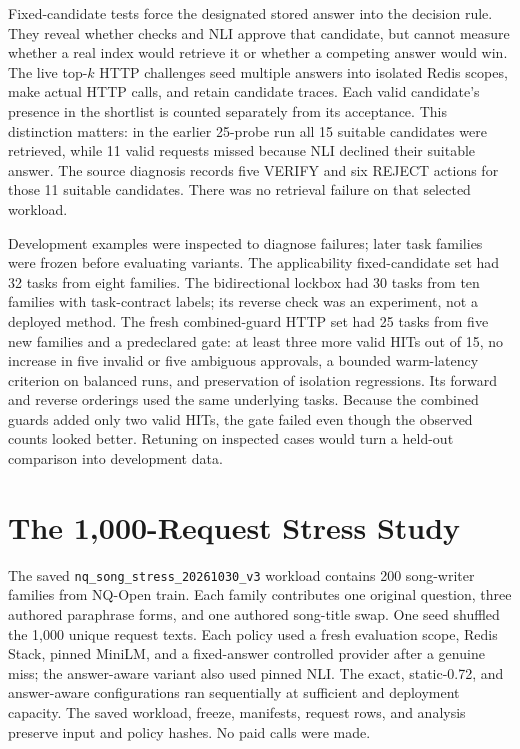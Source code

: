 Fixed-candidate tests force the designated stored answer into the decision rule. They reveal whether checks and NLI approve that candidate, but cannot measure whether a real index would retrieve it or whether a competing answer would win. The live top-$k$ HTTP challenges seed multiple answers into isolated Redis scopes, make actual HTTP calls, and retain candidate traces. Each valid candidate's presence in the shortlist is counted separately from its acceptance. This distinction matters: in the earlier 25-probe run all 15 suitable candidates were retrieved, while 11 valid requests missed because NLI declined their suitable answer. The source diagnosis records five VERIFY and six REJECT actions for those 11 suitable candidates. There was no retrieval failure on that selected workload.

Development examples were inspected to diagnose failures; later task families were frozen before evaluating variants. The applicability fixed-candidate set had 32 tasks from eight families. The bidirectional lockbox had 30 tasks from ten families with task-contract labels; its reverse check was an experiment, not a deployed method. The fresh combined-guard HTTP set had 25 tasks from five new families and a predeclared gate: at least three more valid HITs out of 15, no increase in five invalid or five ambiguous approvals, a bounded warm-latency criterion on balanced runs, and preservation of isolation regressions. Its forward and reverse orderings used the same underlying tasks. Because the combined guards added only two valid HITs, the gate failed even though the observed counts looked better. Retuning on inspected cases would turn a held-out comparison into development data.

\section{The 1,000-Request Stress Study}
The saved \texttt{nq\_song\_stress\_20261030\_v3} workload contains 200 song-writer families from NQ-Open train. Each family contributes one original question, three authored paraphrase forms, and one authored song-title swap. One seed shuffled the 1,000 unique request texts. Each policy used a fresh evaluation scope, Redis Stack, pinned MiniLM, and a fixed-answer controlled provider after a genuine miss; the answer-aware variant also used pinned NLI. The exact, static-0.72, and answer-aware configurations ran sequentially at sufficient and deployment capacity. The saved workload, freeze, manifests, request rows, and analysis preserve input and policy hashes. No paid calls were made.

